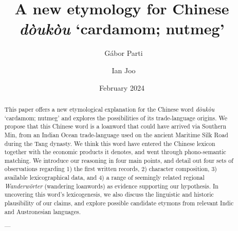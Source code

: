 \documentclass[12pt]{article}
\title{A new etymology for Chinese \tc{豆蔻} \textit{dòukòu} `cardamom; nutmeg' }
\author[1]{{\small\orcid{0000-0003-2042-4655}}~Gábor Parti}
\author[2]{{\small\orcid{}}~Ian Joo}
\affil[1,2]{The Hong Kong Polytechnic University}
\affil[2]{Nagoya University of Commerce and Business}
\date{\small{February 2024}}
\newcommand{\tc}[1]{\traditionalchinesefont{#1}\rmfamily}
\begin{document}
\maketitle

\begin{abstract}
    This paper offers a new etymological explanation for the Chinese word \tc{豆蔻} \textit{dòukòu} `cardamom; nutmeg' and explores the possibilities of its trade-language origins. We propose that this Chinese word is a loanword that could have arrived via Southern Min, from an Indian Ocean trade-language used on the ancient Maritime Silk Road during the Tang dynasty. We think this word have entered the Chinese lexicon together with the economic products it denotes, and went through phono-semantic matching. We introduce our reasoning in four main points, and detail out four sets of observations regarding 1) the first written records, 2) character composition, 3) available lexicographical data, and 4) a range of seemingly related regional \textit{Wanderwörter} (wandering loanwords) as evidence supporting our hypothesis. In uncovering this word's lexicogenesis, we also discuss the linguistic and historic plausibility of our claims, and  explore possible candidate etymons from relevant Indic and Austronesian languages.

    ---


\end{abstract}
\end{document}
